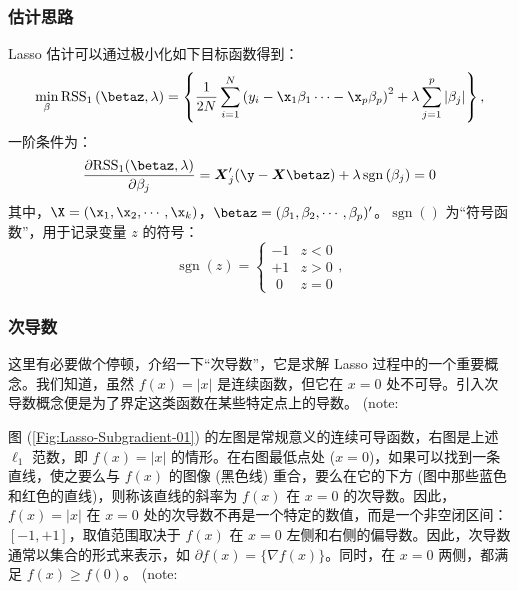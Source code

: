 \subsubsection{估计思路}
Lasso 估计可以通过极小化如下目标函数得到：
\begin{equation}\label{eq:lasso-HTW2015-2-5-B}
\underset{\beta}{\operatorname{min}}
\, \mathrm{RSS}_1\left(\betaz,\lambda\right) = 
\left\{\frac{1}{2 N}
\sum_{i=1}^{N}\left(y_i - \x_1\beta_1 \cdots - \x_p\beta_p \right)^2
   + \lambda \sum_{j=1}^{p}\left|\beta_{j}\right|\right\},
\end{equation}
一阶条件为：
\begin{equation}\label{eq:Lasso-foc-01}
\frac{\partial{\mathrm{RSS}_1(\betaz,\lambda)}}{\partial{\beta_j}} = 
\boldsymbol{X}_{j}^{\prime}(\y-\boldsymbol{X} \betaz)+\lambda \operatorname{sgn}\left(\beta_{j}\right)=0	
\end{equation}
其中，$\X = (\x_1,\x_2,\cdots,\x_k)$，$\betaz=(\beta_1,\beta_2,\cdots,\beta_p)'$。$\operatorname{sgn}()$ 为“符号函数”，用于记录变量 $z$ 的符号：
$$
    \operatorname{sgn}(z) =
    \begin{cases}
      -1 & z < 0\\
      +1 & z > 0\\
      \,\,0 & z = 0
    \end{cases},
$$

\subsubsection{次导数}
这里有必要做个停顿，介绍一下“次导数”，它是求解 Lasso 过程中的一个重要概念。我们知道，虽然 $f(x)=|x|$ 是连续函数，但它在 $x=0$ 处不可导。引入次导数概念便是为了界定这类函数在某些特定点上的导数。 (note: %

图 (\ref{Fig:Lasso-Subgradient-01}) 的左图是常规意义的连续可导函数，右图是上述 $\ell_{1}$ 范数，即 $f(x)=|x|$ 的情形。在右图最低点处 ($x=0$)，如果可以找到一条直线，使之要么与 $f(x)$ 的图像 (黑色线) 重合，要么在它的下方 (图中那些蓝色和红色的直线)，则称该直线的斜率为 $f(x)$ 在 $x=0$ 的次导数。因此，$f(x)=|x|$ 在 $x=0$ 处的次导数不再是一个特定的数值，而是一个非空闭区间：$[-1,+1]$，取值范围取决于 $f(x)$ 在 $x=0$ 左侧和右侧的偏导数。因此，次导数通常以集合的形式来表示，如  $\partial f(x) = \{\nabla f(x)\}$。同时，在 $x=0$ 两侧，都满足 $f(x) \geq f(0)$。 (note: %

